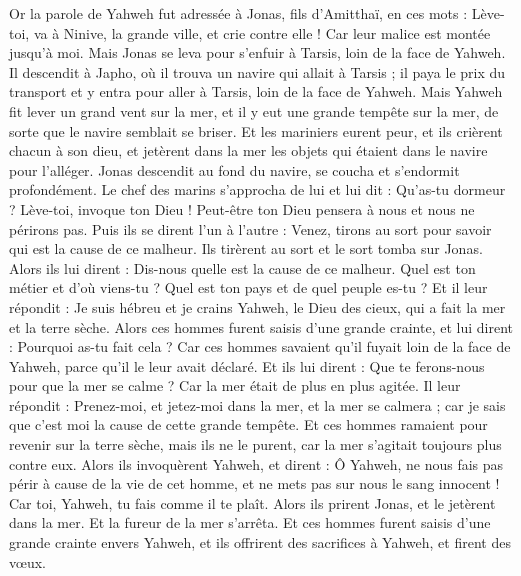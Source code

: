 \begin{multicols}{2}
\VerseOne{}Or la parole de Yahweh fut adressée à Jonas, fils d'Amitthaï, en ces mots :
Lève-toi, va à Ninive, la grande ville, et crie contre elle ! Car leur malice est montée jusqu'à moi.
Mais Jonas se leva pour s'enfuir à Tarsis, loin de la face de Yahweh. Il descendit à Japho, où il trouva un navire qui allait à Tarsis ; il paya le prix du transport et y entra pour aller à Tarsis, loin de la face de Yahweh.
Mais Yahweh fit lever un grand vent sur la mer, et il y eut une grande tempête sur la mer, de sorte que le navire semblait se briser.
Et les mariniers eurent peur, et ils crièrent chacun à son dieu, et jetèrent dans la mer les objets qui étaient dans le navire pour l'alléger. Jonas descendit au fond du navire, se coucha et s'endormit profondément.
Le chef des marins s'approcha de lui et lui dit : Qu'as-tu dormeur ? Lève-toi, invoque ton Dieu ! Peut-être ton Dieu pensera à nous et nous ne périrons pas.
Puis ils se dirent l'un à l'autre : Venez, tirons au sort pour savoir qui est la cause de ce malheur. Ils tirèrent au sort et le sort tomba sur Jonas.
Alors ils lui dirent : Dis-nous quelle est la cause de ce malheur. Quel est ton métier et d'où viens-tu ? Quel est ton pays et de quel peuple es-tu ?
Et il leur répondit : Je suis hébreu et je crains Yahweh, le Dieu des cieux, qui a fait la mer et la terre sèche.
Alors ces hommes furent saisis d'une grande crainte, et lui dirent : Pourquoi as-tu fait cela ? Car ces hommes savaient qu'il fuyait loin de la face de Yahweh, parce qu'il le leur avait déclaré.
Et ils lui dirent : Que te ferons-nous pour que la mer se calme ? Car la mer était de plus en plus agitée.
Il leur répondit : Prenez-moi, et jetez-moi dans la mer, et la mer se calmera ; car je sais que c'est moi la cause de cette grande tempête.
Et ces hommes ramaient pour revenir sur la terre sèche, mais ils ne le purent, car la mer s'agitait toujours plus contre eux.
Alors ils invoquèrent Yahweh, et dirent : Ô Yahweh, ne nous fais pas périr à cause de la vie de cet homme, et ne mets pas sur nous le sang innocent ! Car toi, Yahweh, tu fais comme il te plaît.
Alors ils prirent Jonas, et le jetèrent dans la mer. Et la fureur de la mer s'arrêta.
Et ces hommes furent saisis d'une grande crainte envers Yahweh, et ils offrirent des sacrifices à Yahweh, et firent des vœux.

\end{multicols}
